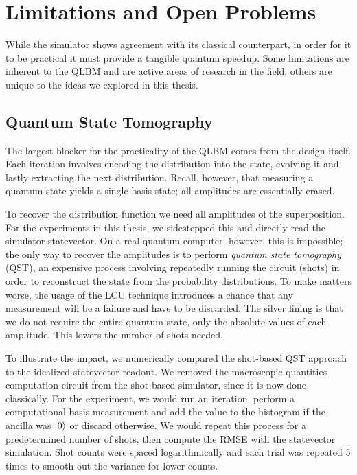 \chapter{Limitations and Open Problems}
\label{chapter:discussion}

While the simulator shows agreement with its classical counterpart, in order for it to be practical it must provide a tangible quantum speedup.
Some limitations are inherent to the QLBM and are active areas of research in the field; others are unique to the ideas we explored in this thesis.

\section{Quantum State Tomography}
The largest blocker for the practicality of the QLBM comes from the design itself.
Each iteration involves encoding the distribution into the state, evolving it and lastly extracting the next distribution.
Recall, however, that measuring a quantum state yields a single basis state; all amplitudes are essentially erased.

To recover the distribution function we need all amplitudes of the superposition.
For the experiments in this thesis, we sidestepped this and directly read the simulator statevector.
On a real quantum computer, however, this is impossible; the only way to recover the amplitudes is to perform \emph{quantum state tomography} (QST),
an expensive process involving repeatedly running the circuit (shots) in order to reconstruct the state from the probability distributions.
To make matters worse, the usage of the LCU technique introduces a chance that any measurement will be a failure and have to be discarded.
The silver lining is that we do not require the entire quantum state, only the absolute values of each amplitude. This lowers the number of shots needed.

To illustrate the impact, we numerically compared the shot-based QST approach to the idealized statevector readout.
We removed the macroscopic quantities computation circuit from the shot-based simulator, since it is now done classically.
For the experiment, we would run an iteration, perform a computational basis measurement and add the value to the histogram if the ancilla was $\ket{0}$ or discard otherwise.
We would repeat this process for a predetermined number of shots, then compute the RMSE with the statevector simulation.
Shot counts were spaced logarithmically and each trial was repeated 5 times to smooth out the variance for lower counts.

